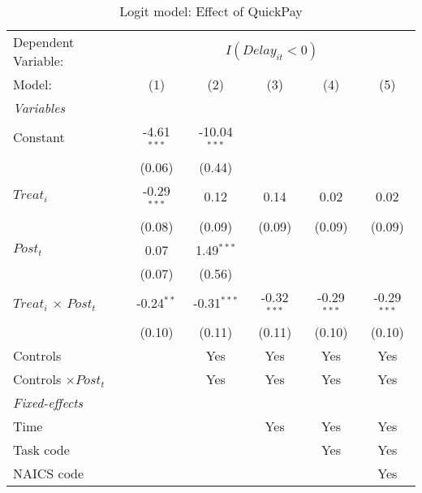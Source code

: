 \documentclass[
]{article}
\begin{document}
\begin{table}[htbp]
   \caption{Logit model: Effect of QuickPay}
   \centering
   \begin{tabular}{lccccc}
      \tabularnewline \midrule \midrule
      Dependent Variable: & \multicolumn{5}{c}{$I(Delay_{it}<0)$}\\
      Model:                       & (1)           & (2)            & (3)           & (4)           & (5)\\  
      \midrule
      \emph{Variables}\\
      Constant                     & -4.61$^{***}$ & -10.04$^{***}$ &               &               &   \\   
                                   & (0.06)        & (0.44)         &               &               &   \\   
      $Treat_i$                    & -0.29$^{***}$ & 0.12           & 0.14          & 0.02          & 0.02\\   
                                   & (0.08)        & (0.09)         & (0.09)        & (0.09)        & (0.09)\\   
      $Post_t$                     & 0.07          & 1.49$^{***}$   &               &               &   \\   
                                   & (0.07)        & (0.56)         &               &               &   \\   
      $Treat_i$ $\times$ $Post_t$  & -0.24$^{**}$  & -0.31$^{***}$  & -0.32$^{***}$ & -0.29$^{***}$ & -0.29$^{***}$\\   
                                   & (0.10)        & (0.11)         & (0.11)        & (0.10)        & (0.10)\\   
      Controls                     &               & Yes            & Yes           & Yes           & Yes\\  
      Controls $\times Post_t$     &               & Yes            & Yes           & Yes           & Yes\\  
      \midrule
      \emph{Fixed-effects}\\
      Time                         &               &                & Yes           & Yes           & Yes\\  
      Task code                    &               &                &               & Yes           & Yes\\  
      NAICS code                   &               &                &               &               & Yes\\  

\end{tabular}
\end{table}
\end{document}
